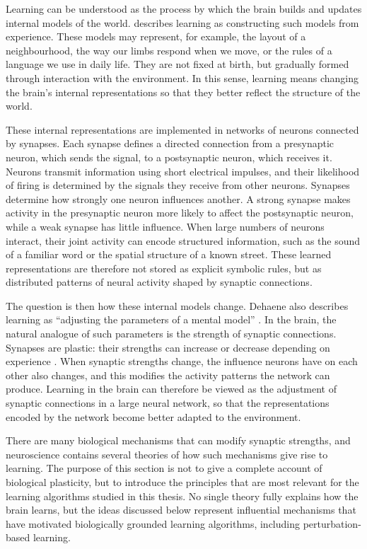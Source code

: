 Learning can be understood as the process by which the brain builds and updates internal models of the world. \textcite{dehaene_how_2021} describes learning as constructing such models from experience. These models may represent, for example, the layout of a neighbourhood, the way our limbs respond when we move, or the rules of a language we use in daily life. They are not fixed at birth, but gradually formed through interaction with the environment. In this sense, learning means changing the brain's internal representations so that they better reflect the structure of the world.

These internal representations are implemented in networks of neurons connected by synapses. Each synapse defines a directed connection from a presynaptic neuron, which sends the signal, to a postsynaptic neuron, which receives it. Neurons transmit information using short electrical impulses, and their likelihood of firing is determined by the signals they receive from other neurons. Synapses determine how strongly one neuron influences another. A strong synapse makes activity in the presynaptic neuron more likely to affect the postsynaptic neuron, while a weak synapse has little influence. When large numbers of neurons interact, their joint activity can encode structured information, such as the sound of a familiar word or the spatial structure of a known street. These learned representations are therefore not stored as explicit symbolic rules, but as distributed patterns of neural activity shaped by synaptic connections.

The question is then how these internal models change. Dehaene also describes learning as ``adjusting the parameters of a mental model'' \parencite{dehaene_how_2021}. In the brain, the natural analogue of such parameters is the strength of synaptic connections. Synapses are plastic: their strengths can increase or decrease depending on experience \parencite{kandel_principles_2021}. When synaptic strengths change, the influence neurons have on each other also changes, and this modifies the activity patterns the network can produce. Learning in the brain can therefore be viewed as the adjustment of synaptic connections in a large neural network, so that the representations encoded by the network become better adapted to the environment.

There are many biological mechanisms that can modify synaptic strengths, and neuroscience contains several theories of how such mechanisms give rise to learning. The purpose of this section is not to give a complete account of biological plasticity, but to introduce the principles that are most relevant for the learning algorithms studied in this thesis. No single theory fully explains how the brain learns, but the ideas discussed below represent influential mechanisms that have motivated biologically grounded learning algorithms, including perturbation-based learning.
